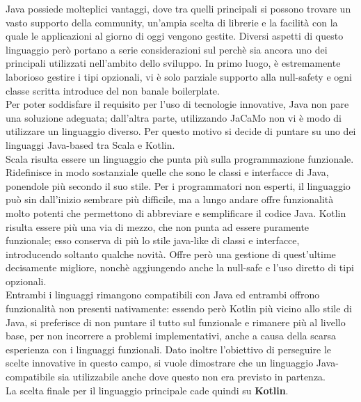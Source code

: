 \documentclass[12pt,a4paper,openright,oneside]{report}
\begin{document}
Java possiede molteplici vantaggi, dove tra quelli principali si possono trovare un vasto supporto della community, un'ampia scelta di librerie e la facilità con la quale le applicazioni al giorno di oggi vengono gestite. Diversi aspetti di questo linguaggio però portano a serie considerazioni sul perchè sia ancora uno dei principali utilizzati nell'ambito dello sviluppo. In primo luogo, è estremamente laborioso gestire i tipi opzionali, vi è solo parziale supporto alla null-safety e ogni classe scritta introduce del non banale boilerplate.\\

Per poter soddisfare il requisito per l'uso di tecnologie innovative, Java non pare una soluzione adeguata; dall'altra parte, utilizzando JaCaMo non vi è modo di utilizzare un linguaggio diverso. Per questo motivo si decide di puntare su uno dei linguaggi Java-based tra Scala e Kotlin.\\

Scala risulta essere un linguaggio che punta più sulla programmazione funzionale. Ridefinisce in modo sostanziale quelle che sono le classi e interfacce di Java, ponendole più secondo il suo stile. Per i programmatori non esperti, il linguaggio può sin dall'inizio sembrare più difficile, ma a lungo andare offre funzionalità molto potenti che permettono di abbreviare e semplificare il codice Java. Kotlin risulta essere più una via di mezzo, che non punta ad essere puramente funzionale; esso conserva di più lo stile java-like di classi e interfacce, introducendo soltanto qualche novità. Offre però una gestione di quest'ultime decisamente migliore, nonchè aggiungendo anche la null-safe e l'uso diretto di tipi opzionali.\\

Entrambi i linguaggi rimangono compatibili con Java ed entrambi offrono funzionalità non presenti nativamente: essendo però Kotlin più vicino allo stile di Java, si preferisce di non puntare il tutto sul funzionale e rimanere più al livello base, per non incorrere a problemi implementativi, anche a causa della scarsa esperienza con i linguaggi funzionali. Dato inoltre l'obiettivo di perseguire le scelte innovative in questo campo, si vuole dimostrare che un linguaggio Java-compatibile sia utilizzabile anche dove questo non era previsto in partenza.\\

La scelta finale per il linguaggio principale cade quindi su \textbf{Kotlin}.
\end{document}
